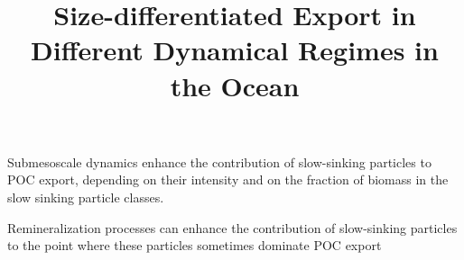 \documentclass[article,linenumbers]{agujournal2018}
\begin{document}
%
%
\title{Size-differentiated Export in Different Dynamical Regimes in the Ocean}

%
%

%
%

\begin{keypoints}
\item Submesoscale dynamics enhance the contribution of slow-sinking particles to POC export, depending on their intensity and on the fraction of biomass in the slow sinking particle classes.
\item Remineralization processes can enhance the contribution of slow-sinking particles to the point where these particles sometimes dominate POC export
\end{keypoints}
\end{document}
